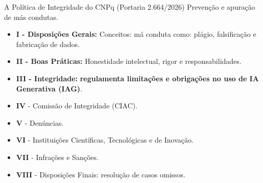 \documentclass[aspectratio=169]{beamer}
\begin{document}
\begin{frame}{A Política de Integridade do CNPq (Portaria 2.664/2026)}
    \footnotesize
    Prevenção e apuração de más condutas.
    
    \vspace{0.2cm}
    \begin{itemize}
        \item \textbf{I - Disposições Gerais:} Conceitos: má conduta como: plágio, falsificação e fabricação de dados.
        \item \textbf{\alert{II - Boas Práticas:}} Honestidade intelectual, rigor e responsabilidades.
        \item \textbf{\alert{III - Integridade:}} \textbf{regulamenta limitações e obrigações no uso de IA Generativa (IAG)}.
        \item \textbf{IV} - Comissão de Integridade (CIAC).
        \item \textbf{V} - Denúncias.
        \item \textbf{VI} - Instituições Científicas, Tecnológicas e de Inovação.
        \item \textbf{VII} - Infrações e Sanções.
        \item \textbf{VIII} - Disposições Finais: resolução de casos omissos.
    \end{itemize}
    
\end{frame}
\end{document}
